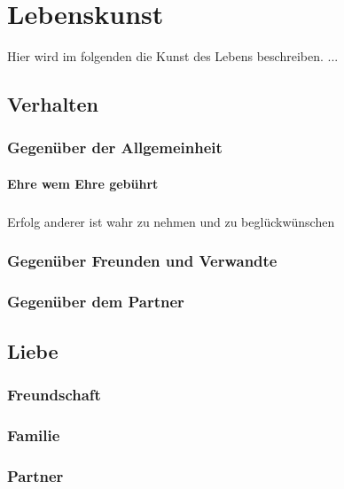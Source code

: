 \chapter{Lebenskunst} 
    \begin{thesis_quotation}
    \end{thesis_quotation}
    
    Hier wird im folgenden die Kunst des Lebens beschreiben. ...
      
    \section{Verhalten}
        \subsection{Gegenüber der Allgemeinheit}
            \subsubsection{Ehre wem Ehre gebührt}
                \paragraph{} Erfolg anderer ist wahr zu nehmen und zu beglückwünschen
        \subsection{Gegenüber Freunden und Verwandte}        
        \subsection{Gegenüber dem Partner}
    \section{Liebe}
        \subsection{Freundschaft}
        \subsection{Familie}
        \subsection{Partner}
            
    
